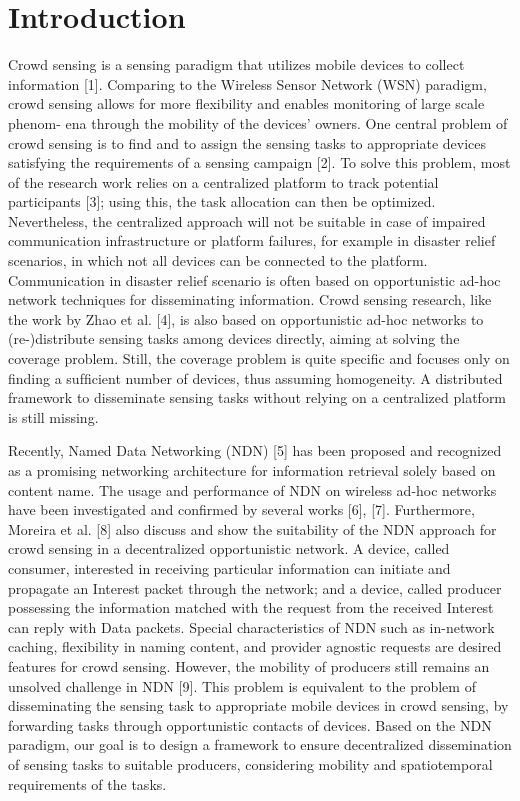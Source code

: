 \documentclass[10pt, conference, compsocconf]{IEEEtran}
\begin{document}
\section{Introduction}
Crowd sensing is a sensing paradigm that utilizes mobile devices to collect information [1]. Comparing to the Wireless Sensor Network (WSN) paradigm, crowd sensing allows for more ﬂexibility and enables monitoring of large scale phenom- ena through the mobility of the devices’ owners. One central problem of crowd sensing is to ﬁnd and to assign the sensing tasks to appropriate devices satisfying the requirements of a sensing campaign [2]. To solve this problem, most of the research work relies on a centralized platform to track potential participants [3]; using this, the task allocation can then be optimized. Nevertheless, the centralized approach  will  not  be suitable in case of impaired communication infrastructure or platform failures, for example in disaster relief scenarios, in which not all devices can be connected to the platform. Communication in disaster relief scenario is often based on opportunistic ad-hoc network techniques for disseminating information. Crowd sensing research, like the work by Zhao et al. [4], is also based on opportunistic ad-hoc networks to (re-)distribute sensing tasks among devices directly, aiming at solving the coverage problem. Still, the coverage problem is quite speciﬁc and focuses only on ﬁnding a sufﬁcient number of devices, thus assuming homogeneity. A distributed framework to disseminate sensing tasks without relying on a centralized platform is still missing.

Recently, Named Data Networking (NDN) [5] has been proposed and recognized as a promising networking architecture for information retrieval solely based on content name. The usage and performance of NDN on wireless ad-hoc networks have been investigated and conﬁrmed by several works [6], [7]. Furthermore, Moreira et al. [8] also discuss and show the suitability of the NDN approach for crowd sensing in a decentralized opportunistic network. A device, called consumer, interested in receiving particular information can initiate and propagate an Interest packet through the network; and a device, called producer possessing the information matched with the request from the received Interest can reply with Data packets. Special characteristics of NDN such as in-network caching, ﬂexibility in naming content, and provider agnostic requests are desired features for crowd sensing. However, the mobility of producers still remains an unsolved challenge in NDN [9]. This problem is equivalent to the problem of disseminating the sensing task to appropriate mobile devices in crowd sensing, by forwarding tasks through opportunistic contacts of devices. Based on the NDN paradigm, our goal is to design   a framework to ensure decentralized dissemination of sensing tasks to suitable producers, considering mobility and spatiotemporal requirements of the tasks.
\end{document}
